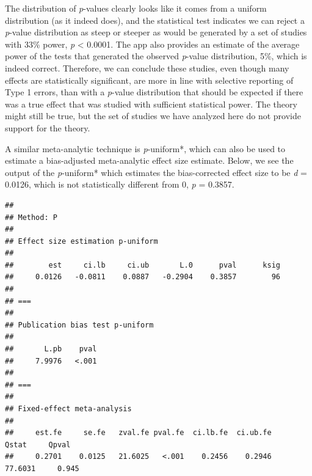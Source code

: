 \documentclass[
  oneside]{book}
\newenvironment{Shaded}{\begin{snugshade}}{\end{snugshade}}
\newcommand{\AttributeTok}[1]{\textcolor[rgb]{0.77,0.63,0.00}{#1}}
\newcommand{\FunctionTok}[1]{\textcolor[rgb]{0.00,0.00,0.00}{#1}}
\newcommand{\NormalTok}[1]{#1}
\newcommand{\SpecialCharTok}[1]{\textcolor[rgb]{0.00,0.00,0.00}{#1}}
\newcommand{\StringTok}[1]{\textcolor[rgb]{0.31,0.60,0.02}{#1}}
\begin{document}
The distribution of \emph{p}-values clearly looks like it comes from a uniform distribution (as it indeed does), and the statistical test indicates we can reject a \emph{p}-value distribution as steep or steeper as would be generated by a set of studies with 33\% power, \emph{p} \textless{} 0.0001. The app also provides an estimate of the average power of the tests that generated the observed \emph{p}-value distribution, 5\%, which is indeed correct. Therefore, we can conclude these studies, even though many effects are statistically significant, are more in line with selective reporting of Type 1 errors, than with a \emph{p}-value distribution that should be expected if there was a true effect that was studied with sufficient statistical power. The theory might still be true, but the set of studies we have analyzed here do not provide support for the theory.

A similar meta-analytic technique is \emph{p}-uniform*, which can also be used to estimate a bias-adjusted meta-analytic effect size estimate. Below, we see the output of the \emph{p}-uniform* which estimates the bias-corrected effect size to be \emph{d} = 0.0126, which is not statistically different from 0, \emph{p} = 0.3857.

\begin{Shaded}
\end{Shaded}

\begin{verbatim}
## 
## Method: P
## 
## Effect size estimation p-uniform
## 
##        est     ci.lb     ci.ub       L.0      pval      ksig
##     0.0126   -0.0811    0.0887   -0.2904    0.3857        96
## 
## ===
## 
## Publication bias test p-uniform
## 
##       L.pb    pval
##     7.9976   <.001
## 
## ===
## 
## Fixed-effect meta-analysis
## 
##     est.fe     se.fe   zval.fe pval.fe  ci.lb.fe  ci.ub.fe     Qstat     Qpval
##     0.2701    0.0125   21.6025   <.001    0.2456    0.2946   77.6031     0.945
\end{verbatim}
\end{document}
